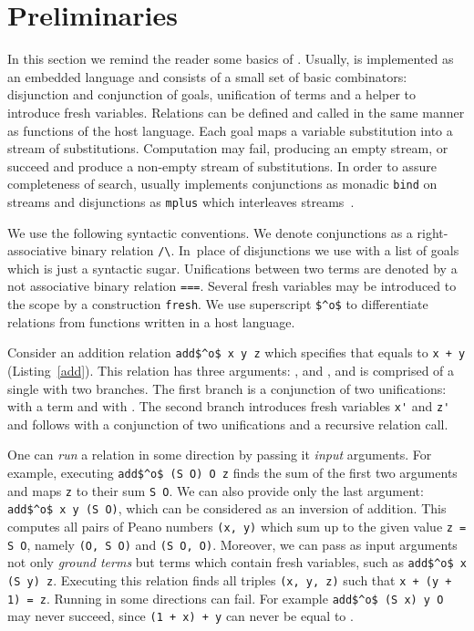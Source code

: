 \section{Preliminaries}

In this section we remind the reader some basics of \mk.
Usually, \mk is implemented as an embedded language and consists of a small set of basic combinators: disjunction and conjunction of goals, unification of terms and a helper to introduce fresh variables.
Relations can be defined and called in the same manner as functions of the host language.
Each \mk goal maps a variable substitution into a stream of substitutions.
Computation may fail, producing an empty stream, or succeed and produce a non-empty stream of substitutions.
In order to assure completeness of search, \mk usually implements conjunctions as monadic \lstinline{bind} on streams and disjunctions as \lstinline{mplus} which interleaves streams~\cite{kiselyov2005backtracking}.

We use the following syntactic conventions.
We denote conjunctions as a right-associative binary relation \lstinline{/\}.
In~place of disjunctions we use \conde with a list of \mk goals which is just a syntactic sugar.
Unifications between two terms are denoted by a not associative binary relation \lstinline{===}.
Several fresh variables may be introduced to the scope by a construction \lstinline{fresh}.
We use superscript \lstinline{$^o$} to differentiate \mk relations from functions written in a host language.

Consider an addition relation \lstinline{add$^o$ x y z} which specifies that \z equals to \lstinline{x + y} (Listing~\ref{add}).
This relation has three arguments: \x, \y and \z, and is comprised of a single \conde with two branches.
The first \conde branch is a conjunction of two unifications: \x with a term \zero and \y with \z.
The second \conde branch introduces fresh variables \lstinline{x'} and \lstinline{z'} and follows with a conjunction of two unifications and a recursive relation call.

One can \emph{run} a relation in some direction by passing it \emph{input} arguments.
For example, executing \lstinline{add$^o$ (S O) O z} finds the sum of the first two arguments and maps \lstinline{z} to their sum \lstinline{S O}.
We can also provide only the last argument: \lstinline{add$^o$ x y (S O)}, which can be considered as an inversion of addition.
This computes all pairs of Peano numbers \lstinline{(x, y)} which sum up to the given value \lstinline{z = S O}, namely \lstinline{(O, S O)} and \lstinline{(S O, O)}.
Moreover, we can pass as input arguments not only \emph{ground terms} but terms which contain fresh variables, such as \lstinline{add$^o$ x (S y) z}.
Executing this relation finds all triples \lstinline{(x, y, z)} such that \lstinline{x + (y + 1) = z}.
Running in some directions can fail.
For example \lstinline{add$^o$ (S x) y O} may never succeed, since \lstinline{(1 + x) + y} can never be equal to \zero.

